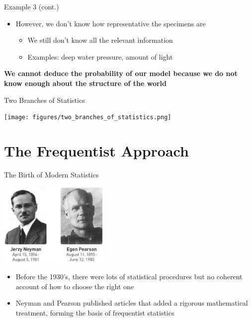 \documentclass[12pt, block=fill]{beamer}
\begin{document}
\begin{frame}{Example 3 (cont.)}
  
    \begin{itemize}
        \item However, we don't know how representative the specimens are
        \begin{itemize}
            \item We still don't know all the relevant information
            \item Examples: deep water pressure, amount of light
        \end{itemize}
  \end{itemize}    
  \textbf{We cannot deduce the probability of our model because we do not know enough about the structure of the world} 
\end{frame}


\begin{frame}{Two Branches of Statistics}
    \begin{center}
        \texttt{[image: figures/two\_branches\_of\_statistics.png]}
    \end{center}
\end{frame}



\section{The Frequentist Approach}

\begin{frame}{The Birth of Modern Statistics}
    \begin{center}
        \includegraphics[width=0.4\textwidth]{figures/neyman_and_pearson.png}     
    \end{center}

  \begin{itemize}
      \item Before the 1930's, there were lots of statistical procedures but no coherent account of how to choose the right one
      \item Neyman and Pearson published articles that added a rigorous mathematical treatment, forming the basis of frequentist statistics
  \end{itemize}

\end{frame}
\end{document}
